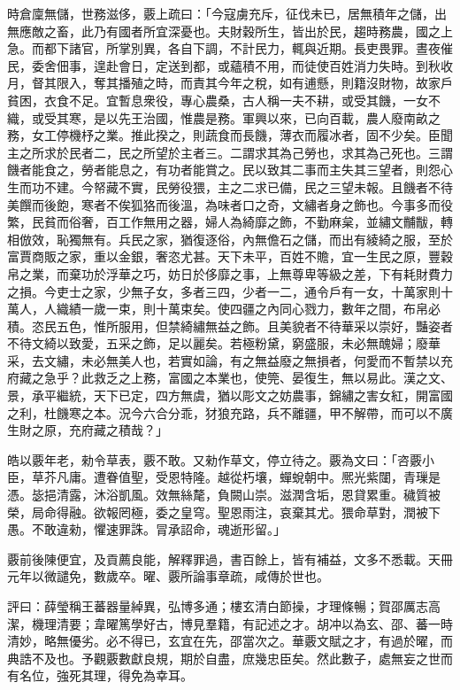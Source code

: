 \begin{pinyinscope}
 
 時倉廩無儲，世務滋侈，覈上疏曰：「今寇虜充斥，征伐未已，居無積年之儲，出無應敵之畜，此乃有國者所宜深憂也。夫財穀所生，皆出於民，趨時務農，國之上急。而都下諸官，所掌別異，各自下調，不計民力，輒與近期。長吏畏罪。晝夜催民，委舍佃事，遑赴會日，定送到都，或蘊積不用，而徒使百姓消力失時。到秋收月，督其限入，奪其播殖之時，而責其今年之稅，如有逋懸，則籍沒財物，故家戶貧困，衣食不足。宜暫息衆役，專心農桑，古人稱一夫不耕，或受其饑，一女不織，或受其寒，是以先王治國，惟農是務。軍興以來，已向百載，農人廢南畝之務，女工停機杼之業。推此揆之，則蔬食而長饑，薄衣而履冰者，固不少矣。臣聞主之所求於民者二，民之所望於主者三。二謂求其為己勞也，求其為己死也。三謂饑者能食之，勞者能息之，有功者能賞之。民以致其二事而主失其三望者，則怨心生而功不建。今帑藏不實，民勞役猥，主之二求已備，民之三望未報。且饑者不待美饌而後飽，寒者不俟狐狢而後溫，為味者口之奇，文繡者身之飾也。今事多而役繁，民貧而俗奢，百工作無用之器，婦人為綺靡之飾，不勤麻枲，並繡文黼黻，轉相倣效，恥獨無有。兵民之家，猶復逐俗，內無儋石之儲，而出有綾綺之服，至於富賈商販之家，重以金銀，奢恣尤甚。天下未平，百姓不贍，宜一生民之原，豐穀帛之業，而棄功於浮華之巧，妨日於侈靡之事，上無尊卑等級之差，下有耗財費力之損。今吏士之家，少無子女，多者三四，少者一二，通令戶有一女，十萬家則十萬人，人織績一歲一束，則十萬束矣。使四疆之內同心戮力，數年之間，布帛必積。恣民五色，惟所服用，但禁綺繡無益之飾。且美貌者不待華采以崇好，豔姿者不待文綺以致愛，五采之飾，足以麗矣。若極粉黛，窮盛服，未必無醜婦；廢華采，去文繡，未必無美人也，若實如論，有之無益廢之無損者，何愛而不暫禁以充府藏之急乎？此救乏之上務，富國之本業也，使筦、晏復生，無以易此。漢之文、景，承平繼統，天下已定，四方無虞，猶以彫文之妨農事，錦繡之害女紅，開富國之利，杜饑寒之本。況今六合分乖，犲狼充路，兵不離疆，甲不解帶，而可以不廣生財之原，充府藏之積哉？」
 
 
 
 
 皓以覈年老，勑令草表，覈不敢。又勑作草文，停立待之。覈為文曰：「咨覈小臣，草芥凡庸。遭眷值聖，受恩特隆。越從朽壤，蟬蛻朝中。熈光紫闥，青璅是憑。毖挹清露，沐浴凱風。效無絲氂，負闕山崇。滋潤含垢，恩貸累重。穢質被榮，局命得融。欲報罔極，委之皇穹。聖恩雨注，哀棄其尤。猥命草對，潤被下愚。不敢違勑，懼速罪誅。冐承詔命，魂逝形留。」
 
 
 
 
 覈前後陳便宜，及貢薦良能，解釋罪過，書百餘上，皆有補益，文多不悉載。天冊元年以微譴免，數歲卒。曜、覈所論事章疏，咸傳於世也。
 
 
 
 
 評曰：薛瑩稱王蕃器量綽異，弘博多通；樓玄清白節操，才理條暢；賀邵厲志高潔，機理清要；韋曜篤學好古，博見羣籍，有記述之才。胡冲以為玄、邵、蕃一時清妙，略無優劣。必不得已，玄宜在先，邵當次之。華覈文賦之才，有過於曜，而典誥不及也。予觀覈數獻良規，期於自盡，庶幾忠臣矣。然此數子，處無妄之世而有名位，強死其理，得免為幸耳。
 
 
\end{pinyinscope}